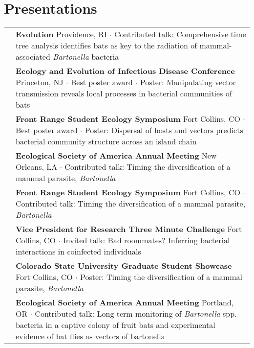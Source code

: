 \documentclass[letterpaper]{deedy-resume} %
\begin{document}

\section{Presentations}
\begin{tabular}{>{\raggedright\arraybackslash}p{2cm}p{16cm}}

2019 & \textbf{Evolution} Providence, RI $\cdot$ Contributed talk: Comprehensive time tree analysis identifies bats as key to the radiation of mammal-associated \textit{Bartonella} bacteria\\

2019 & \textbf{Ecology and Evolution of Infectious Disease Conference} Princeton, NJ $\cdot$ \textcolor{special}{Best poster award} $\cdot$ Poster: Manipulating vector transmission reveals local processes in bacterial communities of bats\\

2019 & \textbf{Front Range Student Ecology Symposium} Fort Collins, CO $\cdot$ \textcolor{special}{Best poster award} $\cdot$ Poster: Dispersal of hosts and vectors predicts bacterial community structure across an island chain\\

2018 & \textbf{Ecological Society of America Annual Meeting} New Orleans, LA $\cdot$ Contributed talk: Timing the diversification of a mammal parasite, \textit{Bartonella}\\

2018 & \textbf{Front Range Student Ecology Symposium} Fort Collins, CO $\cdot$ Contributed talk: Timing the diversification of a mammal parasite, \textit{Bartonella}\\

2018 & \textbf{Vice President for Research Three Minute Challenge} Fort Collins, CO $\cdot$ Invited talk: Bad roommates? Inferring bacterial interactions in coinfected individuals\\

2017 & \textbf{Colorado State University Graduate Student Showcase} Fort Collins, CO $\cdot$ Poster: Timing the diversification of a mammal parasite, \textit{Bartonella}\\

2017 & \textbf{Ecological Society of America Annual Meeting} Portland, OR $\cdot$ Contributed talk: Long-term monitoring of \textit{Bartonella} spp. bacteria in a captive colony of fruit bats and experimental evidence of bat flies as vectors of bartonella\\


\end{tabular}
\end{document}
